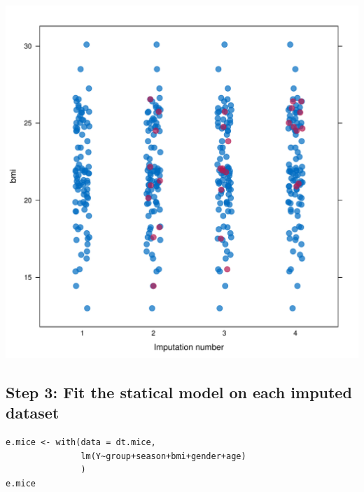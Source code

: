 \documentclass[12pt]{article}
\begin{document}
\begin{center}
\includegraphics[width=.9\linewidth]{./striplotImputed.pdf}
\end{center}

\clearpage

\subsection{Step 3: Fit the statical model on each imputed dataset}
\label{sec:org6d3cdbf}

\lstset{language=r,label= ,caption= ,captionpos=b,numbers=none}
\begin{lstlisting}
e.mice <- with(data = dt.mice,
			   lm(Y~group+season+bmi+gender+age)
			   )
e.mice
\end{lstlisting}
\end{document}
